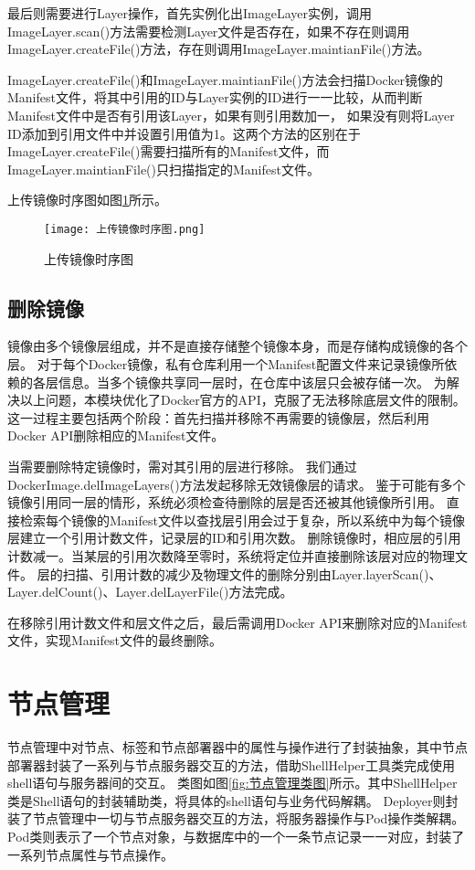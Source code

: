 最后则需要进行Layer操作，首先实例化出ImageLayer实例，调用ImageLayer.scan()方法需要检测Layer文件是否存在，如果不存在则调用ImageLayer.createFile()方法，存在则调用ImageLayer.maintianFile()方法。

ImageLayer.createFile()和ImageLayer.maintianFile()方法会扫描Docker镜像的Manifest文件，将其中引用的ID与Layer实例的ID进行一一比较，从而判断Manifest文件中是否有引用该Layer，如果有则引用数加一，
如果没有则将Layer ID添加到引用文件中并设置引用值为1。这两个方法的区别在于ImageLayer.createFile()需要扫描所有的Manifest文件，而ImageLayer.maintianFile()只扫描指定的Manifest文件。

上传镜像时序图如图\ref{fig:上传镜像时序图}所示。

\begin{figure}[h]
  \centering
  \texttt{[image: 上传镜像时序图.png]}
  \caption{上传镜像时序图}
  \label{fig:上传镜像时序图}
\end{figure}

\subsection{删除镜像}
镜像由多个镜像层组成，并不是直接存储整个镜像本身，而是存储构成镜像的各个层。
对于每个Docker镜像，私有仓库利用一个Manifest配置文件来记录镜像所依赖的各层信息。当多个镜像共享同一层时，在仓库中该层只会被存储一次。
为解决以上问题，本模块优化了Docker官方的API，克服了无法移除底层文件的限制。这一过程主要包括两个阶段：首先扫描并移除不再需要的镜像层，然后利用Docker API删除相应的Manifest文件。

当需要删除特定镜像时，需对其引用的层进行移除。
我们通过DockerImage.delImageLayers()方法发起移除无效镜像层的请求。
鉴于可能有多个镜像引用同一层的情形，系统必须检查待删除的层是否还被其他镜像所引用。
直接检索每个镜像的Manifest文件以查找层引用会过于复杂，所以系统中为每个镜像层建立一个引用计数文件，记录层的ID和引用次数。
删除镜像时，相应层的引用计数减一。当某层的引用次数降至零时，系统将定位并直接删除该层对应的物理文件。
层的扫描、引用计数的减少及物理文件的删除分别由Layer.layerScan()、Layer.delCount()、Layer.delLayerFile()方法完成。

在移除引用计数文件和层文件之后，最后需调用Docker API来删除对应的Manifest文件，实现Manifest文件的最终删除。


\section{节点管理}
节点管理中对节点、标签和节点部署器中的属性与操作进行了封装抽象，其中节点部署器封装了一系列与节点服务器交互的方法，借助ShellHelper工具类完成使用shell语句与服务器间的交互。
类图如图\ref{fig:节点管理类图}所示。其中ShellHelper类是Shell语句的封装辅助类，将具体的shell语句与业务代码解耦。
Deployer则封装了节点管理中一切与节点服务器交互的方法，将服务器操作与Pod操作类解耦。
Pod类则表示了一个节点对象，与数据库中的一个一条节点记录一一对应，封装了一系列节点属性与节点操作。

